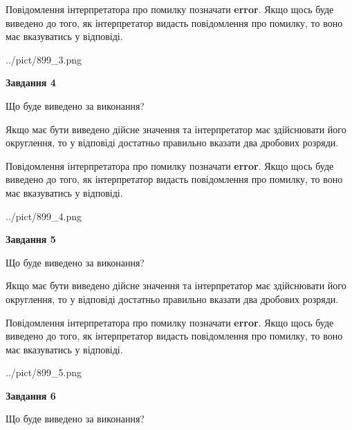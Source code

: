 \documentclass[12pt, ukrainian]{article}
\begin{document}
{\begin {Large}
Повідомлення інтерпретатора про помилку позначати \textbf{error}.
Якщо щось буде виведено до того, як інтерпретатор видасть повідомлення про помилку, 
то воно має вказуватись у відповіді. \par

\begin{center}
	{../pict/899_3.png}
\end{center}
\newpage

{\begin {center}\textbf{Завдання 4}\end {center}}\par
Що буде виведено за виконання? \par

Якщо має бути виведено дійсне значення та інтерпретатор має здійснювати його округлення, 
то у відповіді достатньо правильно вказати два дробових розряди.

Повідомлення інтерпретатора про помилку позначати \textbf{error}.
Якщо щось буде виведено до того, як інтерпретатор видасть повідомлення про помилку, 
то воно має вказуватись у відповіді. \par

\begin{center}
	{../pict/899_4.png}
\end{center}
\newpage

{\begin {center}\textbf{Завдання 5}\end {center}}\par
Що буде виведено за виконання? \par

Якщо має бути виведено дійсне значення та інтерпретатор має здійснювати його округлення, 
то у відповіді достатньо правильно вказати два дробових розряди.

Повідомлення інтерпретатора про помилку позначати \textbf{error}.
Якщо щось буде виведено до того, як інтерпретатор видасть повідомлення про помилку, 
то воно має вказуватись у відповіді. \par

\begin{center}
	{../pict/899_5.png}
\end{center}
\newpage

{\begin {center}\textbf{Завдання 6}\end {center}}\par
Що буде виведено за виконання? \par


\end{Large}}
\end{document}
